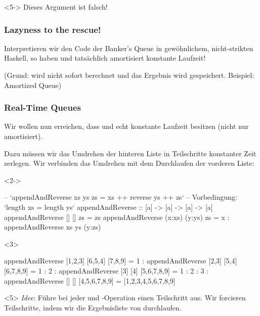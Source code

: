 \documentclass{beamer}
\begin{document}
\begin{frame}[t,fragile]
\begin{onlyenv}<5->
  \vspace{0.5cm}
  {\color{red} Dieses Argument ist falsch!}
\end{onlyenv}
\end{frame}

\begin{frame}[t,fragile]
  \frametitle{Lazyness to the rescue!}

  Interpretieren wir den Code der Banker's Queue in gewöhnlichem, nicht-strikten Haskell, so haben  und  tatsächlich amortisiert konstante Laufzeit!

  (Grund:  wird nicht sofort berechnet und das Ergebnis wird gespeichert. Beispiel: Amortized Queue)
\end{frame}

\begin{frame}[t,fragile]
  \frametitle{Real-Time Queues}
  Wir wollen nun erreichen, dass  und  echt konstante Laufzeit besitzen (nicht nur amortisiert).

  Dazu müssen wir das Umdrehen der hinteren Liste in Teilschritte konstanter Zeit zerlegen.
  Wir verbinden das Umdrehen mit dem Durchlaufen der vorderen Liste:

  \begin{onlyenv}<2->
\begin{haskellcode}
-- `appendAndReverse xs ys zs = xs ++ reverse ys ++ zs`
-- Vorbedingung: `length xs = length ys`
appendAndReverse :: [a] -> [a] -> [a] -> [a]
appendAndReverse [] [] zs = zs
appendAndReverse (x:xs) (y:ys) zs =
  x : appendAndReverse xs ys (y:zs)
\end{haskellcode}
  \end{onlyenv}

  \begin{onlyenv}<3>
\begin{haskellcode}
  appendAndReverse [1,2,3] [6,5,4] [7,8,9]
= 1 : appendAndReverse [2,3] [5,4] [6,7,8,9]
= 1 : 2 : appendAndReverse [3] [4] [5,6,7,8,9]
= 1 : 2 : 3 : appendAndReverse [] [] [4,5,6,7,8,9]
= [1,2,3,4,5,6,7,8,9]
\end{haskellcode}
  \end{onlyenv}

  \begin{onlyenv}<5>
    \textit{Idee}: Führe bei jeder  und -Operation einen Teilschritt aus.
    Wir forcieren Teilschritte, indem wir die Ergebnisliste von  durchlaufen.
  \end{onlyenv}
\end{frame}
\end{document}
